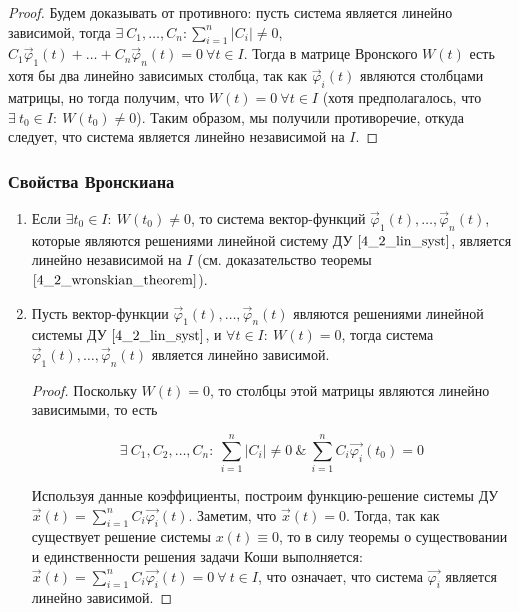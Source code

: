 \begin{proof}
    Будем доказывать от противного: пусть система является линейно зависимой, тогда $\exists ~ C_1, \dots, C_n: \sum\limits^n_{i = 1} |C_i| \neq 0$,
    $C_1 \overrightarrow \varphi_1(t) + \dots + C_n \overrightarrow \varphi_n(t) = 0 ~ \forall t \in I$. Тогда в матрице Вронского $W(t)$
    есть хотя бы два линейно зависимых столбца, так как $\overrightarrow \varphi_i(t)$ являются столбцами матрицы, но тогда получим, что
    $W(t) = 0 ~ \forall t \in I$ (хотя предполагалось, что $\exists ~ t_0 \in I : ~ W(t_0) \neq 0$). Таким образом, мы получили противоречие,
    откуда следует, что система является линейно независимой на $I$.
\end{proof}

\subsubsection{Свойства Вронскиана}
\label{wr_properties}

\begin{enumerate}
    \item Если $\exists t_0 \in I : ~ W(t_0) \neq 0$, то система вектор-функций $\overrightarrow \varphi_1(t), \dots, \overrightarrow \varphi_n(t)$, которые являются решениями линейной систему ДУ $\eqref{4_2_lin_syst}$, является линейно независимой на $I$ (см. доказательство теоремы $\eqref{4_2_wronskian_theorem}$).
    \item Пусть вектор-функции $\overrightarrow \varphi_1(t), \dots, \overrightarrow \varphi_n(t)$ являются решениями линейной системы ДУ $\eqref{4_2_lin_syst}$, и $\forall t \in I: ~ W(t) = 0$, тогда система $\overrightarrow \varphi_1(t), \dots, \overrightarrow \varphi_n(t)$ является линейно зависимой.

    \begin{proof}
        Поскольку $W(t) = 0$, то столбцы этой матрицы являются линейно зависимыми, то есть
        
        \[ \exists ~ C_1, C_2, \dots, C_n : ~ \sum_{i = 1}^n |C_i| \neq 0 ~ \& ~ \sum_{i = 1}^n C_i \overrightarrow{\varphi_i}(t_0) = 0 \]
        
        Используя данные коэффициенты, построим функцию-решение системы ДУ $\overrightarrow{x}(t) = \sum\limits_{i = 1}^n C_i \overrightarrow{\varphi_i}(t)$. Заметим, что $\overrightarrow{x}(t) = 0$. Тогда, так как существует решение системы $x(t) \equiv 0$, то в силу теоремы о существовании и единственности решения задачи Коши выполняется: $\overrightarrow{x}(t) = \sum\limits_{i = 1}^n C_i \overrightarrow{\varphi_i}(t) = 0 ~ \forall ~ t \in I$, что означает, что система $\overrightarrow{\varphi_i}$ является линейно зависимой.
    \end{proof}
    
\end{enumerate}
